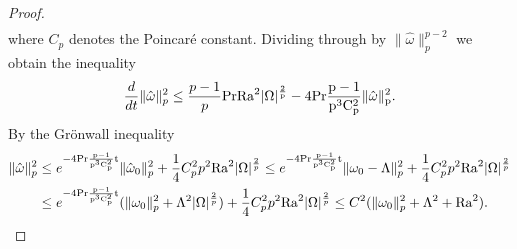 \documentclass{article}
\theoremstyle{definition}
\theoremstyle{definition}
\newcommand{\Pra}{\rm{Pr}}
\newcommand{\Ra}{{\rm{Ra}}}
\begin{document}
\begin{proof}
\begin{align*}
\end{align*}
where $C_p$ denotes the Poincar\'e constant.
Dividing through by $\|\hat{\omega}\|_p^{p-2}$ we obtain the inequality
\begin{align*}
    \frac{d}{dt}\|\hat\omega\|_p^2 \leq \frac{p-1}{p} \Pra \Ra^2 |\Omega|^\frac{2}{p} - 4 \Pra \frac{p-1}{p^3 C_p^2} \|\hat\omega\|_p^2.
\end{align*}
By the Gr\"onwall inequality
\begin{align*}
    \|\hat\omega\|_p^2 
    &\leq e^{- 4 \Pra \frac{p-1}{p^3 C_p^2} t} \|\hat\omega_0\|_p^2 +\frac{1}{4} C_p^2 p^2 \Ra^2 |\Omega|^\frac{2}{p}
    \leq e^{- 4 \Pra \frac{p-1}{p^3 C_p^2} t}  \|\omega_0-\Lambda\|_p^2 +\frac{1}{4} C_p^2 p^2 \Ra^2 |\Omega|^\frac{2}{p}
    \\
    &
    \leq e^{- 4 \Pra \frac{p-1}{p^3 C_p^2} t}  (\|\omega_0\|_p^2+\Lambda^2|\Omega|^{\frac 2p})+\frac{1}{4} C_p^2 p^2 \Ra^2 |\Omega|^\frac{2}{p}
    \leq C^2(\|\omega_0\|_p^2+\Lambda^2+ \Ra^2).
\end{align*}



\end{proof}
\end{document}
